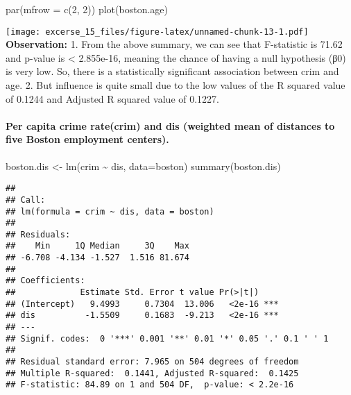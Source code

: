 \documentclass[
]{article}
\newenvironment{Shaded}{\begin{snugshade}}{\end{snugshade}}
\newcommand{\AttributeTok}[1]{\textcolor[rgb]{0.77,0.63,0.00}{#1}}
\newcommand{\DecValTok}[1]{\textcolor[rgb]{0.00,0.00,0.81}{#1}}
\newcommand{\FunctionTok}[1]{\textcolor[rgb]{0.00,0.00,0.00}{#1}}
\newcommand{\NormalTok}[1]{#1}
\newcommand{\OtherTok}[1]{\textcolor[rgb]{0.56,0.35,0.01}{#1}}
\newcommand{\SpecialCharTok}[1]{\textcolor[rgb]{0.00,0.00,0.00}{#1}}
\begin{document}
\begin{Shaded}
\begin{Highlighting}[]
\FunctionTok{par}\NormalTok{(}\AttributeTok{mfrow =} \FunctionTok{c}\NormalTok{(}\DecValTok{2}\NormalTok{, }\DecValTok{2}\NormalTok{))}
\FunctionTok{plot}\NormalTok{(boston.age)}
\end{Highlighting}
\end{Shaded}

\texttt{[image: excerse\_15\_files/figure-latex/unnamed-chunk-13-1.pdf]}
\textbf{Observation:} 1. From the above summary, we can see that
F-statistic is 71.62 and p-value is \textless{} 2.855e-16, meaning the
chance of having a null hypothesis (β0) is very low. So, there is a
statistically significant association between crim and age. 2. But
influence is quite small due to the low values of the R squared value of
0.1244 and Adjusted R squared value of 0.1227.

\hypertarget{per-capita-crime-ratecrim-and-dis-weighted-mean-of-distances-to-five-boston-employment-centers.}{%
\paragraph{Per capita crime rate(crim) and dis (weighted mean of
distances to five Boston employment
centers).}\label{per-capita-crime-ratecrim-and-dis-weighted-mean-of-distances-to-five-boston-employment-centers.}}

\begin{Shaded}
\begin{Highlighting}[]
\NormalTok{boston.dis }\OtherTok{\textless{}{-}} \FunctionTok{lm}\NormalTok{(crim }\SpecialCharTok{\textasciitilde{}}\NormalTok{ dis, }\AttributeTok{data=}\NormalTok{boston)}
\FunctionTok{summary}\NormalTok{(boston.dis)}
\end{Highlighting}
\end{Shaded}

\begin{verbatim}
## 
## Call:
## lm(formula = crim ~ dis, data = boston)
## 
## Residuals:
##    Min     1Q Median     3Q    Max 
## -6.708 -4.134 -1.527  1.516 81.674 
## 
## Coefficients:
##             Estimate Std. Error t value Pr(>|t|)    
## (Intercept)   9.4993     0.7304  13.006   <2e-16 ***
## dis          -1.5509     0.1683  -9.213   <2e-16 ***
## ---
## Signif. codes:  0 '***' 0.001 '**' 0.01 '*' 0.05 '.' 0.1 ' ' 1
## 
## Residual standard error: 7.965 on 504 degrees of freedom
## Multiple R-squared:  0.1441, Adjusted R-squared:  0.1425 
## F-statistic: 84.89 on 1 and 504 DF,  p-value: < 2.2e-16
\end{verbatim}
\end{document}
